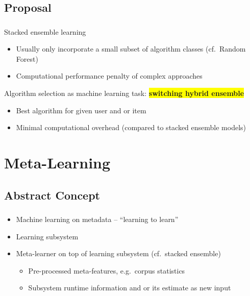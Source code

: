 \documentclass[aspectratio=169]{beamer}
\begin{document}
\subsection{Proposal}
\begin{frame}
	\frametitle{\insertsection}
	\framesubtitle{\insertsubsection}

	\begin{itemize}
		\item Stacked ensemble learning
		\begin{itemize}
			\item Usually only incorporate a small subset of algorithm classes (cf.\ Random Forest)
			\item Computational performance penalty of complex approaches
		\end{itemize}
		{
			\item Algorithm selection as machine learning task: \colorbox{yellow}{\bf{switching hybrid ensemble}}
		}
		\begin{itemize}
			\item Best algorithm for given user and or item
			\item Minimal computational overhead (compared to stacked ensemble models)
		\end{itemize}
	\end{itemize}
\end{frame}

\section[Literature]{Meta-Learning}
\frame{\vfill\centering\tableofcontents[sectionstyle=show/shaded,subsectionstyle=show/hide]\vfill}

\subsection{Abstract Concept}
\begin{frame}
	\frametitle{\insertsection}
	\framesubtitle{\insertsubsection}

	\begin{itemize}
		\item Machine learning on metadata -- ``learning to learn''
		\item Learning subsystem
		\item Meta-learner on top of learning subsystem (cf.\ stacked ensemble)
		\begin{itemize}
			\item Pre-processed meta-features, e.g.~corpus statistics
			\item Subsystem runtime information and or its estimate as new input
		\end{itemize}
	\end{itemize}
\end{frame}
\end{document}
